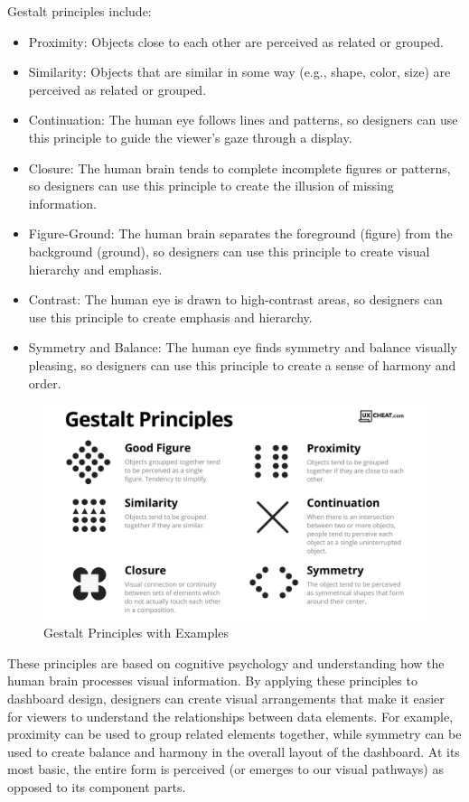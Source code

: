 \documentclass[print]{nuthesis}
\providecommand{\tightlist}{%
  \setlength{\itemsep}{0pt}\setlength{\parskip}{0pt}}
\begin{document}
Gestalt principles include:

\begin{itemize}
\tightlist
\item
  Proximity: Objects close to each other are perceived as related or grouped.
\item
  Similarity: Objects that are similar in some way (e.g., shape, color, size) are perceived as related or grouped.
\item
  Continuation: The human eye follows lines and patterns, so designers can use this principle to guide the viewer's gaze through a display.
\item
  Closure: The human brain tends to complete incomplete figures or patterns, so designers can use this principle to create the illusion of missing information.
\item
  Figure-Ground: The human brain separates the foreground (figure) from the background (ground), so designers can use this principle to create visual hierarchy and emphasis.
\item
  Contrast: The human eye is drawn to high-contrast areas, so designers can use this principle to create emphasis and hierarchy.
\item
  Symmetry and Balance: The human eye finds symmetry and balance visually pleasing, so designers can use this principle to create a sense of harmony and order.
\end{itemize}

\begin{figure}

{\centering \includegraphics[width=0.75\linewidth]{figure/gestalt_principles} 

}

\caption{Gestalt Principles with Examples}\label{fig:gestalt}
\end{figure}

These principles are based on cognitive psychology and understanding how the human brain processes visual information.
By applying these principles to dashboard design, designers can create visual arrangements that make it easier for viewers to understand the relationships between data elements.
For example, proximity can be used to group related elements together, while symmetry can be used to create balance and harmony in the overall layout of the dashboard.
At its most basic, the entire form is perceived (or emerges to our visual pathways) as opposed to its component parts.
\end{document}
